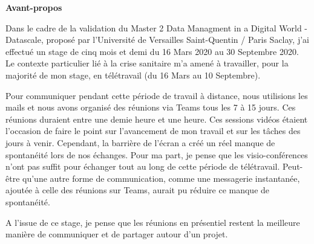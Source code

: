 \documentclass[11pt]{article}
\begin{document}
\newpage
\begin{center}
	\textbf{Avant-propos}
\end{center}
\hspace*{0.4cm}
Dans le cadre de la validation du Master 2 Data Managment in a Digital World - Datascale, proposé par l'Université de Versailles Saint-Quentin / Paris Saclay, j'ai effectué un stage de cinq mois et demi du 16 Mars 2020 au 30 Septembre 2020.
Le contexte particulier lié à la crise sanitaire m'a amené à travailler, pour la majorité de mon stage, en télétravail (du 16 Mars au 10 Septembre).\par
Pour communiquer pendant cette période de travail à distance, nous utilisions les mails et nous avons organisé des réunions via Teams tous les 7 à 15 jours.
Ces réunions duraient entre une demie heure et une heure.
Ces sessions vidéos étaient l'occasion de faire le point sur l'avancement de mon travail et sur les tâches des jours à venir.
Cependant, la barrière de l'écran a créé un réel manque de spontanéité lors de nos échanges.
Pour ma part, je pense que les visio-conférences n'ont pas suffit pour échanger tout au long de cette période de télétravail. 
Peut-être qu'une autre forme de communication, comme une messagerie instantanée, ajoutée à celle des réunions sur Teams, aurait pu réduire ce manque de spontanéité.\par
A l'issue de ce stage, je pense que les réunions en présentiel restent la meilleure manière de communiquer et de partager autour d'un projet.

\newpage
\renewcommand{\contentsname}{Table des matières}\tableofcontents

\newpage
\end{document}
